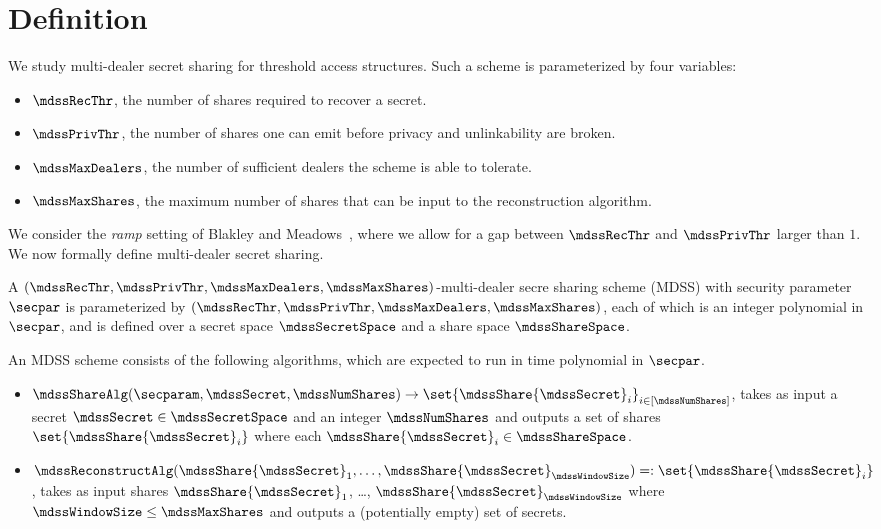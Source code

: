 \section{Definition}\label{sec:mdss-definition}
We study multi-dealer secret sharing for threshold access structures. Such a scheme is parameterized by four variables:

\begin{itemize}
	\item $\mdssRecThr$, the number of shares required to recover a secret.
	\item $\mdssPrivThr$, the number of shares one can emit before privacy and unlinkability are broken.
	\item $\mdssMaxDealers$, the number of sufficient dealers the scheme is able to tolerate.
	\item  $\mdssMaxShares$, the maximum number of shares that can be input to the reconstruction algorithm.
\end{itemize}

We consider the \emph{ramp} setting of Blakley and Meadows~\cite{C:BlaMea84}, where we allow for a gap between $\mdssRecThr$ and $\mdssPrivThr$ larger than $1$.
We now formally define multi-dealer secret sharing.

\begin{definition}
	A $(\mdssRecThr, \mdssPrivThr, \mdssMaxDealers, \mdssMaxShares)$-multi-dealer secre sharing scheme (MDSS) with security parameter $\secpar$ is parameterized by $(\mdssRecThr, \mdssPrivThr, \mdssMaxDealers, \mdssMaxShares)$, each of which is an integer polynomial in $\secpar$, and is defined over a secret space $\mdssSecretSpace$ and a share space $\mdssShareSpace$.

	An MDSS scheme consists of the following algorithms, which are expected to run in time polynomial in $\secpar$.

	\begin{itemize}
		\item $\mdssShareAlg(\secparam, \mdssSecret, \mdssNumShares) \rightarrow \set{\mdssShare{\mdssSecret}_i}_{i \in [\mdssNumShares]}$, takes as input a secret $\mdssSecret \in \mdssSecretSpace$ and an integer $\mdssNumShares$ and outputs a set of shares $\set{\mdssShare{\mdssSecret}_i}$ where each $\mdssShare{\mdssSecret}_i \in \mdssShareSpace$.
		\item $\mdssReconstructAlg(\mdssShare{\mdssSecret}_1, \dots, \mdssShare{\mdssSecret}_{\mdssWindowSize}) =: \set{\mdssShare{\mdssSecret}_i}$, takes as input shares $\mdssShare{\mdssSecret}_1$, \dots, $\mdssShare{\mdssSecret}_{\mdssWindowSize}$ where $\mdssWindowSize \leq \mdssMaxShares$ and outputs a (potentially empty) set of secrets.
	\end{itemize}
\end{definition}

